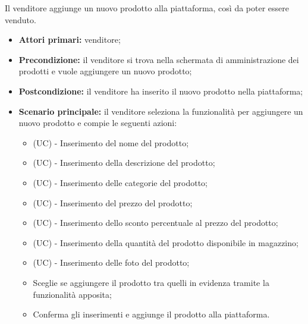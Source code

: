 Il venditore aggiunge un nuovo prodotto alla piattaforma, così da poter essere venduto.
\begin{itemize}
    \item \textbf{Attori primari:} venditore;
    \item \textbf{Precondizione:} il venditore si trova nella schermata di amministrazione dei prodotti e vuole aggiungere un nuovo prodotto;
    \item \textbf{Postcondizione:} il venditore ha inserito il nuovo prodotto nella piattaforma;
    \item \textbf{Scenario principale:} il venditore seleziona la funzionalità per aggiungere un nuovo prodotto e compie le seguenti azioni:
    \begin{itemize}
        \item (UC) - Inserimento del nome del prodotto;
        \item (UC) - Inserimento della descrizione del prodotto;
        \item (UC) - Inserimento delle categorie del prodotto;
        \item (UC) - Inserimento del prezzo del prodotto;
        \item (UC) - Inserimento dello sconto percentuale al prezzo del prodotto;
        \item (UC) - Inserimento della quantità del prodotto disponibile in magazzino;
        \item (UC) - Inserimento delle foto del prodotto;
        \item Sceglie se aggiungere il prodotto tra quelli in evidenza tramite la funzionalità apposita;
        \item Conferma gli inserimenti e aggiunge il prodotto alla piattaforma.
    \end{itemize}
\end{itemize}

